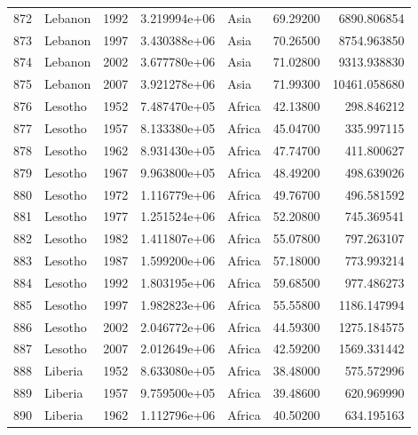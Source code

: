 \documentclass[
  letterpaper,
  DIV=11,
  numbers=noendperiod]{scrreprt}
\begin{document}
\begin{tabular}{llrrlrr}
872  &                   Lebanon &  1992 &  3.219994e+06 &      Asia &  69.29200 &    6890.806854 \\
873  &                   Lebanon &  1997 &  3.430388e+06 &      Asia &  70.26500 &    8754.963850 \\
874  &                   Lebanon &  2002 &  3.677780e+06 &      Asia &  71.02800 &    9313.938830 \\
875  &                   Lebanon &  2007 &  3.921278e+06 &      Asia &  71.99300 &   10461.058680 \\
876  &                   Lesotho &  1952 &  7.487470e+05 &    Africa &  42.13800 &     298.846212 \\
877  &                   Lesotho &  1957 &  8.133380e+05 &    Africa &  45.04700 &     335.997115 \\
878  &                   Lesotho &  1962 &  8.931430e+05 &    Africa &  47.74700 &     411.800627 \\
879  &                   Lesotho &  1967 &  9.963800e+05 &    Africa &  48.49200 &     498.639026 \\
880  &                   Lesotho &  1972 &  1.116779e+06 &    Africa &  49.76700 &     496.581592 \\
881  &                   Lesotho &  1977 &  1.251524e+06 &    Africa &  52.20800 &     745.369541 \\
882  &                   Lesotho &  1982 &  1.411807e+06 &    Africa &  55.07800 &     797.263107 \\
883  &                   Lesotho &  1987 &  1.599200e+06 &    Africa &  57.18000 &     773.993214 \\
884  &                   Lesotho &  1992 &  1.803195e+06 &    Africa &  59.68500 &     977.486273 \\
885  &                   Lesotho &  1997 &  1.982823e+06 &    Africa &  55.55800 &    1186.147994 \\
886  &                   Lesotho &  2002 &  2.046772e+06 &    Africa &  44.59300 &    1275.184575 \\
887  &                   Lesotho &  2007 &  2.012649e+06 &    Africa &  42.59200 &    1569.331442 \\
888  &                   Liberia &  1952 &  8.633080e+05 &    Africa &  38.48000 &     575.572996 \\
889  &                   Liberia &  1957 &  9.759500e+05 &    Africa &  39.48600 &     620.969990 \\
890  &                   Liberia &  1962 &  1.112796e+06 &    Africa &  40.50200 &     634.195163 \\

\end{tabular}
\end{document}
